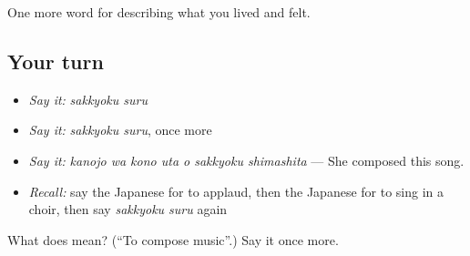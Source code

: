 \begin{grammarlens}[title={What you've built}]
One more word for describing what you lived and felt.
\end{grammarlens}

\subsection*{Your turn}
\begin{itemize}
\raggedright
  \item \emph{Say it:} \emph{sakkyoku suru}
  \item \emph{Say it:} \emph{sakkyoku suru}, once more
  \item \emph{Say it:} \emph{kanojo wa kono uta o sakkyoku shimashita} — She composed this song.
  \item \emph{Recall:} say the Japanese for to applaud, then the Japanese for to sing in a choir, then say \emph{sakkyoku suru} again
\end{itemize}

\begin{tcolorbox}[breakable,colback=teal!4,colframe=teal!35!black,title={Before you move on}]
What does  mean? (\textquotedblleft{}To compose music\textquotedblright{}.) Say it once more.
\end{tcolorbox}
